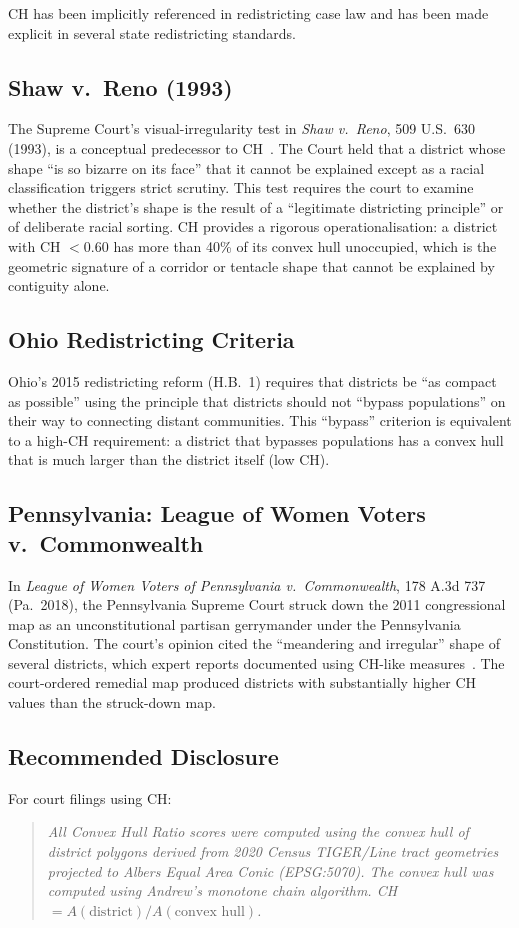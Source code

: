CH has been implicitly referenced in redistricting case law and has been
made explicit in several state redistricting standards.

\subsection{Shaw v.\ Reno (1993)}

The Supreme Court's visual-irregularity test in \textit{Shaw v.\ Reno},
509 U.S.\ 630 (1993), is a conceptual predecessor to CH~\citep{shaw1993}.
The Court held that a district whose shape ``is so bizarre on its face'' that
it cannot be explained except as a racial classification triggers strict scrutiny.
This test requires the court to examine whether the district's shape is the
result of a ``legitimate districting principle'' or of deliberate racial sorting.
CH provides a rigorous operationalisation: a district with CH $< 0.60$ has
more than 40\% of its convex hull unoccupied, which is the geometric signature
of a corridor or tentacle shape that cannot be explained by contiguity alone.

\subsection{Ohio Redistricting Criteria}

Ohio's 2015 redistricting reform (H.B.\ 1) requires that districts be
``as compact as possible'' using the principle that districts should not
``bypass populations'' on their way to connecting distant communities.
This ``bypass'' criterion is equivalent to a high-CH requirement:
a district that bypasses populations has a convex hull that is much larger
than the district itself (low CH).

\subsection{Pennsylvania: League of Women Voters v.\ Commonwealth}

In \textit{League of Women Voters of Pennsylvania v.\ Commonwealth},
178 A.3d 737 (Pa.\ 2018), the Pennsylvania Supreme Court struck down the
2011 congressional map as an unconstitutional partisan gerrymander under
the Pennsylvania Constitution.
The court's opinion cited the ``meandering and irregular'' shape of several
districts, which expert reports documented using CH-like measures~\citep{lwvpa2018}.
The court-ordered remedial map produced districts with substantially higher
CH values than the struck-down map.

\subsection{Recommended Disclosure}

For court filings using CH:
\begin{quote}
  \emph{All Convex Hull Ratio scores were computed using the convex hull of
  district polygons derived from 2020 Census TIGER/Line tract geometries
  projected to Albers Equal Area Conic (EPSG:5070). The convex hull was
  computed using Andrew's monotone chain algorithm. CH $= A(\text{district}) /
  A(\text{convex hull})$.}
\end{quote}
